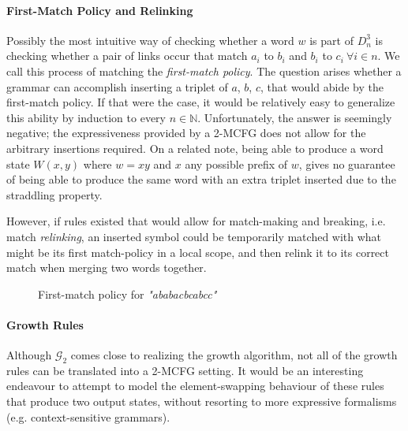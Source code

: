 \documentclass[nonatbib,numbers,10pt]{llncs}
\newcommand{\w}[1]{\textit{"#1"}}
\begin{document}
\paragraph{\textbf{First-Match Policy and Relinking}}
Possibly the most intuitive way of checking whether a word $w$ is part of $D^3_n$ is checking whether a pair of links occur that match $a_i$ to $b_i$ and $b_i$ to $c_i \ \forall i \in n$. We call this process of matching the \textit{first-match policy}. The question arises whether a grammar can accomplish inserting a triplet of $a$, $b$, $c$, that would abide by the first-match policy. If that were the case, it would be relatively easy to generalize this ability by induction to every $n \in \mathbb{N}$. Unfortunately, the answer is seemingly negative; the expressiveness provided by a 2-MCFG does not allow for the arbitrary insertions required. On a related note, being able to produce a word state $W(x,y)$ where $w=xy$ and $x$ any possible prefix of $w$, gives no guarantee of being able to produce the same word with an extra triplet inserted due to the straddling property. 

However, if rules existed that would allow for match-making and breaking, i.e. match \textit{relinking}, an inserted symbol could be temporarily matched with what might be its first match-policy in a local scope, and then relink it to its correct match when merging two words together.
\begin{figure}[h!]
\centering
{}
\caption{First-match policy for \w{ababacbcabcc}}
\label{fig:fmp}
\end{figure}
\paragraph{\textbf{Growth Rules}}
Although $\mathcal{G}_2$ comes close to realizing the growth algorithm, not all of the growth rules can be translated into a 2-MCFG setting. It would be an interesting endeavour to attempt to model the element-swapping behaviour of these rules that produce two output states, without resorting to more expressive formalisms (e.g. context-sensitive grammars).
\end{document}
